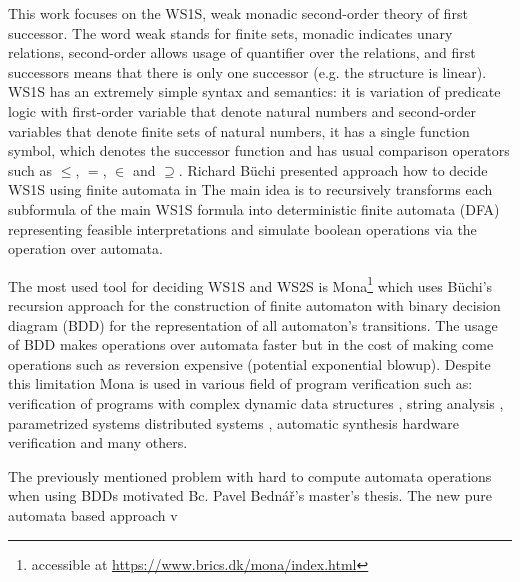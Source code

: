 \documentclass[pdflatex,sn-mathphys-num]{sn-jnl}%
\theoremstyle{thmstyleone}%
\theoremstyle{thmstyletwo}%
\theoremstyle{thmstylethree}%
\begin{document}
    This work focuses on the WS1S, weak monadic second-order theory of first successor. The word weak stands for finite sets, monadic indicates unary relations, second-order allows usage of quantifier over the relations, and first successors means that there is only one successor (e.g. the structure is linear). WS1S \cite{WS1S} has an extremely simple syntax and semantics: it is variation of predicate logic with first-order variable that denote natural numbers and second-order variables that denote finite sets of natural numbers, it has a single function symbol, which denotes the successor function and has usual comparison operators such as $\leq$, $=$, $\in$ and $\supseteq$. Richard Büchi presented approach how to decide WS1S using finite automata in \cite{Buchi} The main idea is to recursively transforms each subformula of the main WS1S formula into deterministic finite automata (DFA) representing feasible interpretations and simulate boolean operations via the operation over automata.

    The most used tool for deciding WS1S and WS2S is Mona\footnote{accessible at \url{https://www.brics.dk/mona/index.html}} which uses Büchi's recursion approach for the construction of finite automaton with binary decision diagram (BDD) for the representation of all automaton's transitions. The usage of BDD makes operations over automata faster but in the cost of making come operations such as reversion expensive (potential exponential blowup). Despite this limitation Mona is used in various field of program verification such as:  verification of programs with complex dynamic data structures \cite{DDS1, DDS2}, string analysis \cite{string_analysis}, parametrized systems \cite{parametrized_systems} distributed systems \cite{distributed_systems}, automatic synthesis \cite{automatic_synthesis} hardware verification \cite{hardware_verification} and many others.

    The previously mentioned problem with hard to compute automata operations when using BDDs motivated Bc. Pavel Bednář's master's thesis. The new pure automata based approach v





\end{document}
